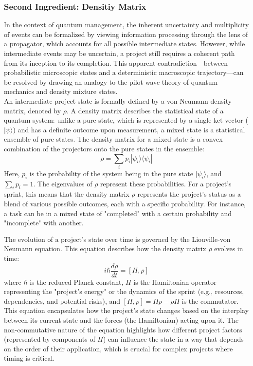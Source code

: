 \documentclass{article}
\begin{document}
\subsubsection*{Second Ingredient: Densitiy Matrix}
In the context of quantum management, the inherent uncertainty and multiplicity of events can be formalized by viewing information processing through the lens of a propagator, which accounts for all possible intermediate states. However, while intermediate events may be uncertain, a project still requires a coherent path from its inception to its completion. This apparent contradiction—between probabilistic microscopic states and a deterministic macroscopic trajectory—can be resolved by drawing an analogy to the pilot-wave theory of quantum mechanics and density mixture states.
\\An intermediate project state is formally defined by a von Neumann density matrix, denoted by $\rho$. A density matrix describes the statistical state of a quantum system: unlike a pure state, which is represented by a single ket vector ($|\psi\rangle$) and has a definite outcome upon measurement, a mixed state is a statistical ensemble of pure states. The density matrix for a mixed state is a convex combination of the projectors onto the pure states in the ensemble:
$$
\rho = \sum_i p_i |\psi_i\rangle\langle\psi_i|
$$
Here, $p_i$ is the probability of the system being in the pure state $|\psi_i\rangle$, and $\sum_i p_i = 1$. The eigenvalues of $\rho$ represent these probabilities. For a project's sprint, this means that the density matrix $\rho$ represents the project's status as a blend of various possible outcomes, each with a specific probability. For instance, a task can be in a mixed state of "completed" with a certain probability and "incomplete" with another.

The evolution of a project's state over time is governed by the Liouville-von Neumann equation. This equation describes how the density matrix $\rho$ evolves in time:
$$
i\hbar\frac{d\rho}{dt} = [H, \rho]
$$
where $\hbar$ is the reduced Planck constant, $H$ is the Hamiltonian operator representing the "project's energy" or the dynamics of the sprint (e.g., resources, dependencies, and potential risks), and $[H, \rho] = H\rho - \rho H$ is the commutator. This equation encapsulates how the project's state changes based on the interplay between its current state and the forces (the Hamiltonian) acting upon it. The non-commutative nature of the equation highlights how different project factors (represented by components of $H$) can influence the state in a way that depends on the order of their application, which is crucial for complex projects where timing is critical.
\end{document}
